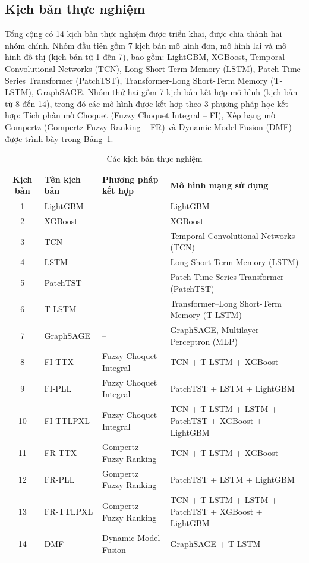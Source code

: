 \documentclass[10pt,twoside]{article}
\begin{document}
\subsection{Kịch bản thực nghiệm}
Tổng cộng có 14 kịch bản thực nghiệm được triển khai, được chia thành hai nhóm chính. Nhóm đầu tiên gồm 7 kịch bản mô hình đơn, mô hình lai và mô hình đồ thị (kịch bản từ 1 đến 7), bao gồm: LightGBM, XGBoost, Temporal Convolutional Networks (TCN), Long Short-Term Memory (LSTM), Patch Time Series Transformer (PatchTST), Transformer-Long Short-Term Memory (T-LSTM), GraphSAGE. Nhóm thứ hai gồm 7 kịch bản kết hợp mô hình (kịch bản từ 8 đến 14), trong đó các mô hình được kết hợp theo 3 phương pháp học kết hợp: Tích phân mờ Choquet (Fuzzy Choquet Integral – FI), Xếp hạng mờ Gompertz (Gompertz Fuzzy Ranking – FR) và Dynamic Model Fusion (DMF) được trình bày trong Bảng~\ref{tab:experimental_scenarios}.
\begin{table}[H] 
\centering 
\caption{Các kịch bản thực nghiệm} 
\label{tab:experimental_scenarios} 
\begin{tabular}{c l l >{\raggedright\arraybackslash}p{6.5cm}} 
\hline 
\textbf{Kịch bản} & \textbf{Tên kịch bản} & \textbf{Phương pháp kết hợp} & \textbf{Mô hình mạng sử dụng} \\ \hline 
1 & LightGBM & -- & LightGBM \\ 
2 & XGBoost & -- & XGBoost \\ 
3 & TCN & -- & Temporal Convolutional Networks (TCN) \\ 
4 & LSTM & -- & Long Short-Term Memory (LSTM) \\ 
5 & PatchTST & -- & Patch Time Series Transformer (PatchTST) \\ 
6 & T-LSTM & -- & Transformer--Long Short-Term Memory (T-LSTM) \\ 
7 & GraphSAGE & -- & GraphSAGE, Multilayer Perceptron (MLP) \\ 
8 & FI-TTX & Fuzzy Choquet Integral & TCN + T-LSTM + XGBoost \\ 
9 & FI-PLL & Fuzzy Choquet Integral & PatchTST + LSTM + LightGBM \\ 
10 & FI-TTLPXL & Fuzzy Choquet Integral & TCN + T-LSTM + LSTM + PatchTST + XGBoost + LightGBM \\ 
11 & FR-TTX & Gompertz Fuzzy Ranking & TCN + T-LSTM + XGBoost \\ 
12 & FR-PLL & Gompertz Fuzzy Ranking & PatchTST + LSTM + LightGBM \\ 
13 & FR-TTLPXL & Gompertz Fuzzy Ranking & TCN + T-LSTM + LSTM + PatchTST + XGBoost + LightGBM \\ 
14 & DMF & Dynamic Model Fusion & GraphSAGE + T-LSTM \\ \hline \end{tabular} 
\end{table}
\end{document}
